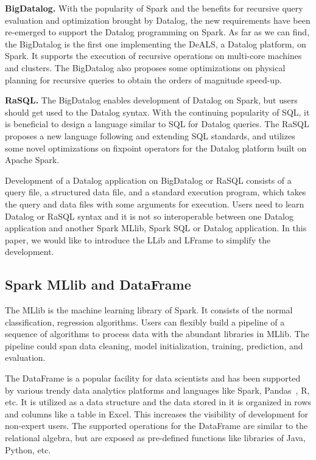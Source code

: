\textbf{BigDatalog.}
With the popularity of Spark and the benefits for recursive query evaluation and optimization brought by Datalog, the new requirements have been re-emerged to support the Datalog programming on Spark. 
As far as we can find, the BigDatalog \citep{shkapsky2016big} is the first one implementing the DeALS, a Datalog platform, on Spark. It supports the execution of recursive operations on  multi-core machines and clusters. The BigDatalog also proposes some optimizations on physical planning for recursive queries to obtain the orders of magnitude speed-up. 

\textbf{RaSQL.} 
The BigDatalog enables development of Datalog on Spark, but users should get used to the Datalog syntax. With the continuing popularity of SQL, it is beneficial to design a language similar to SQL for Datalog queries. The RaSQL \citep{gu2019rasql} proposes a new language following and extending SQL standards, and utilizes some novel optimizations on fixpoint operators for the Datalog platform built on Apache Spark.  

Development of a Datalog application on BigDatalog or RaSQL  consists of a query file, a structured data file, and a standard execution program, which takes the query and data files with some arguments for execution. Users need to learn Datalog or RaSQL syntax and it is not so interoperable  between one Datalog application and another Spark MLlib, Spark SQL or Datalog application. In this paper, we would like to  introduce the LLib and LFrame to  simplify the development.


\subsection{Spark MLlib and DataFrame}

The MLlib is the machine learning library of Spark. It consists of the normal classification, regression algorithms. Users can flexibly build a pipeline of a sequence of algorithms to process data with the abundant libraries in MLlib. The pipeline could span data cleaning, model initialization, training, prediction, and evaluation.  

The DataFrame is a popular facility for data scientists and has been supported by various trendy data analytics platforms and languages like Spark, Pandas~\citep{pythonDataframe}, R, etc. It is utilized as a data structure and the data stored in it is organized in rows and columns like a table in Excel. This increases the visibility of development for non-expert users. The supported operations for the DataFrame are similar to the relational algebra, but are exposed as pre-defined functions like libraries of Java, Python, etc.   

